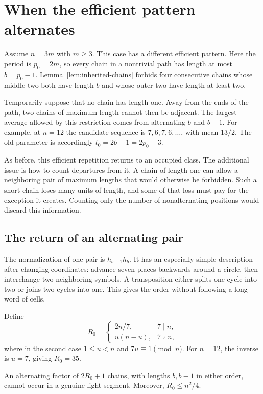 \section{When the efficient pattern alternates}

Assume $n=3m$ with $m\ge3$. This case has a different efficient pattern. Here the period is
$p_0=2m$, so every chain in a nontrivial path has length at most
$b=p_0-1$. Lemma~\ref{lem:inherited-chains} forbids four consecutive chains
whose middle two both have length $b$ and whose outer two have
length at least two.

Temporarily suppose that no chain has length one. Away from the ends of
the path, two chains of maximum length cannot then be adjacent. The
largest average allowed by this restriction comes from alternating $b$
and $b-1$. For example, at $n=12$ the candidate sequence is
$7,6,7,6,\ldots$, with mean $13/2$. The old parameter is accordingly
$t_0=2b-1=2p_0-3$.

As before, this efficient repetition returns to an occupied class. The
additional issue is how to count departures from it. A chain of length
one can allow a neighboring pair of maximum lengths that would otherwise
be forbidden. Such a short chain loses many units of length, and some of
that loss must pay for the exception it creates. Counting only the number
of nonalternating positions would discard this information.

\subsection{The return of an alternating pair}

The normalization of one pair is $h_{b-1}h_b$. It has an especially
simple description after changing coordinates: advance seven places
backwards around a circle, then interchange two neighboring symbols.
A transposition either splits one cycle into two or joins two cycles
into one. This gives the order without following a long word of cells.

Define
\begin{equation}\label{eq:R0}
 R_0=\begin{cases}
 2n/7,&7\mid n,\\
 u(n-u),&7\nmid n,
 \end{cases}
\end{equation}
where in the second case $1\le u<n$ and $7u\equiv1\pmod n$.
For $n=12$, the inverse is $u=7$, giving $R_0=35$.

\begin{lemma}\label{lem:alternating-return}
An alternating factor of $2R_0+1$ chains, with lengths $b,b-1$ in
either order, cannot occur in a genuine light segment. Moreover,
$R_0\le n^2/4$.
\end{lemma}


